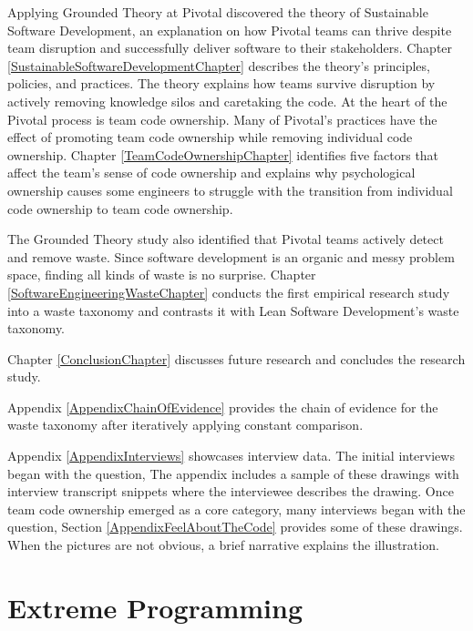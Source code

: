 Applying Grounded Theory at Pivotal discovered the theory of Sustainable Software Development, an explanation on how Pivotal teams can thrive despite team disruption and successfully deliver software to their stakeholders. Chapter \ref{SustainableSoftwareDevelopmentChapter} describes the theory's principles, policies, and practices. The theory explains how teams survive disruption by actively removing knowledge silos and caretaking the code. At the heart of the Pivotal process is team code ownership. Many of Pivotal's practices have the effect of promoting team code ownership while removing individual code ownership. Chapter \ref{TeamCodeOwnershipChapter} identifies five factors that affect the team's sense of code ownership and explains why psychological ownership causes some engineers to struggle with the transition from individual code ownership to team code ownership. 

The Grounded Theory study also identified that Pivotal teams actively detect and remove waste. Since software development is an organic and messy problem space, finding all kinds of waste is no surprise. Chapter \ref{SoftwareEngineeringWasteChapter} conducts the first empirical research study into a waste taxonomy and contrasts it with Lean Software Development's waste taxonomy.

Chapter \ref{ConclusionChapter} discusses future research and concludes the research study. 

Appendix \ref{AppendixChainOfEvidence} provides the chain of evidence for the waste taxonomy after iteratively applying constant comparison. 

Appendix \ref{AppendixInterviews} showcases interview data. The initial interviews began with the question,  The appendix includes a sample of these drawings with interview transcript snippets where the interviewee describes the drawing. Once team code ownership emerged as a core category, many interviews began with the question,  Section \ref{AppendixFeelAboutTheCode} provides some of these drawings. When the pictures are not obvious, a brief narrative explains the illustration.


\chapter{Extreme Programming}
\label{ExtremeProgramming}

